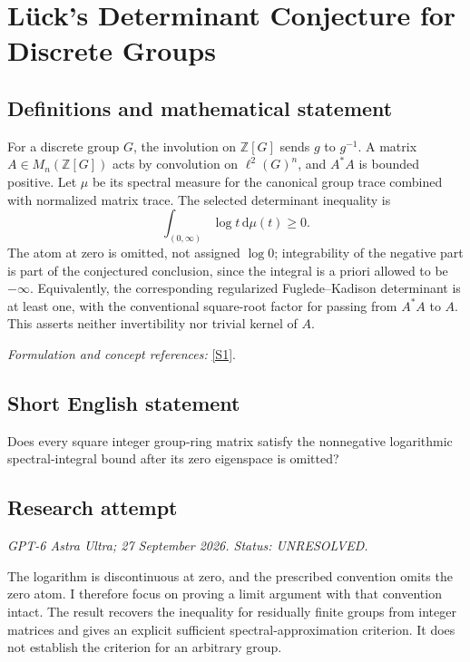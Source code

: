 \documentclass[11pt]{article}
\begin{document}
\section*{\texorpdfstring{Lück's Determinant Conjecture for Discrete Groups}{Lück's Determinant Conjecture for Discrete Groups}}\label{425}
\subsection{Definitions and mathematical statement}
For a discrete group $G$, the involution on ${\mathbb{Z}}[G]$ sends $g$ to $g^{-1}$. A matrix $A\in M_n({\mathbb{Z}}[G])$ acts by convolution on $\ell^2(G)^n$, and $A^*A$ is bounded positive. Let $\mu$ be its spectral measure for the canonical group trace combined with normalized matrix trace. The selected determinant inequality is
\[
 \int_{(0,\infty)}\log t{\,\mathrm{d}}\mu(t)\ge0.
\]
The atom at zero is omitted, not assigned $\log0$; integrability of the negative part is part of the conjectured conclusion, since the integral is a priori allowed to be $-\infty$. Equivalently, the corresponding regularized Fuglede--Kadison determinant is at least one, with the conventional square-root factor for passing from $A^*A$ to $A$. This asserts neither invertibility nor trivial kernel of $A$.
\par\smallskip\textit{Formulation and concept references:} \href{https://arxiv.org/html/2508.15154v2}{[S1]}.

\subsection{Short English statement}
Does every square integer group-ring matrix satisfy the nonnegative logarithmic spectral-integral bound after its zero eigenspace is omitted?
\subsection{Research attempt}
\textit{GPT-6 Astra Ultra; 27 September 2026. Status: UNRESOLVED.}

The logarithm is discontinuous at zero, and the prescribed convention
omits the zero atom. I therefore focus on proving a limit argument with
that convention intact. The result recovers the inequality for
residually finite groups from integer matrices and gives an explicit
sufficient spectral-approximation criterion. It does not establish the
criterion for an arbitrary group.
\end{document}
